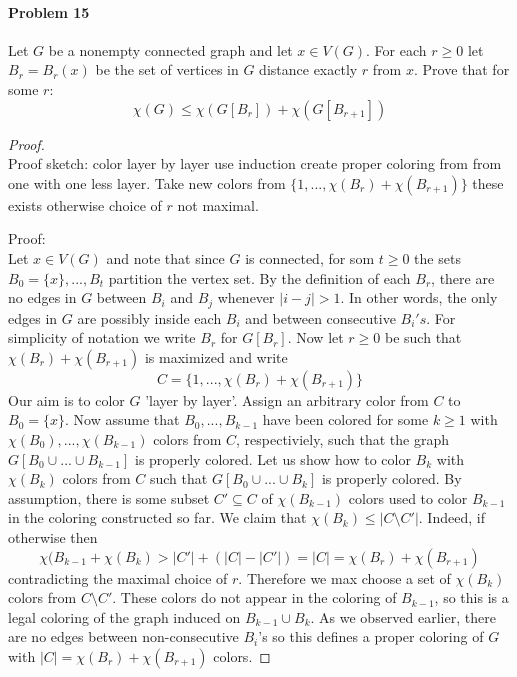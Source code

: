 \paragraph{Problem 15}
Let $G$ be a nonempty connected graph and let $x \in V(G)$. For each $r \geq 0$
let $B_r = B_r(x)$ be the set of vertices in $G$ distance exactly $r$ from 
$x$. Prove that for some $r$:
$$ \chi(G) \leq \chi(G[B_r]) + \chi(G[B_{r+1}]) $$
\begin{proof} $ $\\
Proof sketch: color layer by layer use induction create proper coloring from 
from one with one less layer. Take new colors from $\{1,...,\chi(B_r)
+ \chi(B_{r+1})\}$ these exists otherwise choice of $r$ not maximal. 

\bigskip
Proof: \\
Let $x \in V(G)$ and note that since $G$ is connected, for som $t \geq 0$ the 
sets $B_0 = \{x\},...,B_t$ partition the vertex set. By the definition of 
each $B_r$, there are no edges in $G$ between $B_i$ and $B_j$ whenever 
$|i-j| > 1$. In other words, the only edges in $G$ are possibly inside each 
$B_i$ and between consecutive $B_i's$. For simplicity of notation we write 
$B_r$ for $G[B_r]$. Now let $r \geq 0$ be such that $\chi(B_r) + \chi(B_{r+1})$
is maximized and write 
$$ C = \{1,...,\chi(B_r) + \chi(B_{r+1})\} $$
Our aim is to color $G$ 'layer by layer'. Assign an arbitrary color from $C$
to $B_0 = \{x\}$. Now assume that $B_0,...,B_{k-1}$ have been colored for some
$k \geq 1$ with $\chi(B_0),...,\chi(B_{k-1})$ colors from $C$, respectiviely,
such that the graph $G[B_0 \cup ... \cup B_{k-1}]$ is properly colored. Let us 
show how to color $B_k$ with $\chi(B_k)$ colors from $C$ such that 
$G[B_0 \cup ... \cup B_k]$ is properly colored. By assumption, there is some
subset $C' \subseteq C$ of $\chi(B_{k-1})$ colors used to color $B_{k-1}$ in 
the coloring constructed so far. We claim that $\chi(B_k)\leq |C\setminus C'|$.
Indeed, if otherwise then
$$ \chi(B_{k-1} + \chi(B_k) > |C'| + (|C| - |C'|) = |C| = \chi(B_r)
+ \chi(B_{r+1}) $$
contradicting the maximal choice of $r$. Therefore we max choose a set of 
$\chi(B_k)$ colors from $C \setminus C'$. These colors do not appear in the 
coloring of $B_{k-1}$, so this is a legal coloring of the graph induced on
$B_{k-1} \cup B_k$. As we observed earlier, there are no edges between 
non-consecutive $B_i$'s so this defines a proper coloring of $G$ with 
$|C| = \chi(B_r) + \chi(B_{r+1})$ colors.
\end{proof}


